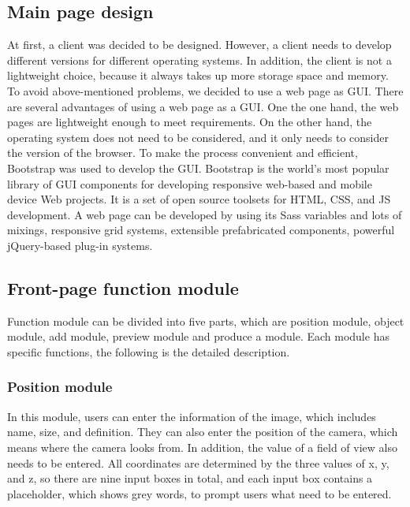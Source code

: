 \documentclass[11pt]{article}
\begin{document}
\subsection{Main page design}
At first, a client was decided to be designed. However, a client needs to develop different versions for different operating systems. In addition, the client is not a lightweight choice, because it always takes up more storage space and memory. To avoid above-mentioned problems, we decided to use a web page as GUI.
There are several advantages of using a web page as a GUI. One the one hand, the web pages are lightweight enough to meet requirements. On the other hand, the operating system does not need to be considered, and it only needs to consider the version of the browser.
To make the process convenient and efficient, Bootstrap was used to develop the GUI. Bootstrap is the world's most popular library of GUI components for developing responsive web-based and mobile device Web projects. It is a set of open source toolsets for HTML, CSS, and JS development. A web page can be developed by using its Sass variables and lots of mixings, responsive grid systems, extensible prefabricated components, powerful jQuery-based plug-in systems.

\subsection{Front-page function module}
Function module can be divided into five parts, which are position module, object module, add module, preview module and produce a module. Each module has specific functions, the following is the detailed description.

\subsubsection{Position module}
In this module, users can enter the information of the image, which includes name, size, and definition. They can also enter the position of the camera, which means where the camera looks from. In addition, the value of a field of view also needs to be entered. All coordinates are determined by the three values of x, y, and z, so there are nine input boxes in total, and each input box contains a placeholder, which shows grey words, to prompt users what need to be entered.
\end{document}
